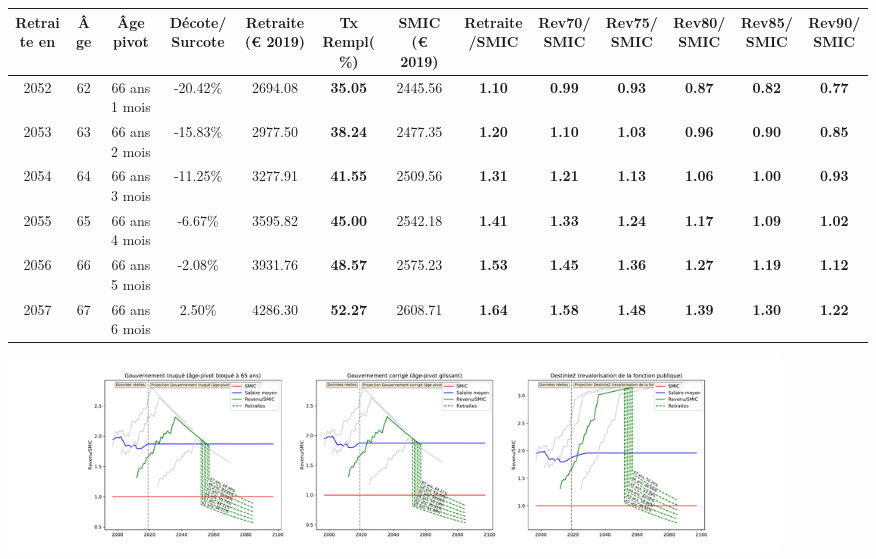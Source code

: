 { \scriptsize \begin{center} 
\begin{tabular}[htb]{|c|c||c|c||c|c||c||c|c|c|c|c|c|} 
\hline 
 Retraite en &  Âge &  Âge pivot &  Décote/Surcote &  Retraite (\euro{} 2019) &  Tx Rempl(\%) &  SMIC (\euro{} 2019) &  Retraite/SMIC &  Rev70/SMIC &  Rev75/SMIC &  Rev80/SMIC &  Rev85/SMIC &  Rev90/SMIC \\ 
\hline \hline 
 2052 &  62 &  66 ans 1 mois &  -20.42\% &  2694.08 &  {\bf 35.05} &  2445.56 &  {\bf 1.10} &  {\bf {\color{red} 0.99}} &  {\bf {\color{red} 0.93}} &  {\bf {\color{red} 0.87}} &  {\bf {\color{red} 0.82}} &  {\bf {\color{red} 0.77}} \\ 
\hline 
 2053 &  63 &  66 ans 2 mois &  -15.83\% &  2977.50 &  {\bf 38.24} &  2477.35 &  {\bf 1.20} &  {\bf 1.10} &  {\bf 1.03} &  {\bf {\color{red} 0.96}} &  {\bf {\color{red} 0.90}} &  {\bf {\color{red} 0.85}} \\ 
\hline 
 2054 &  64 &  66 ans 3 mois &  -11.25\% &  3277.91 &  {\bf 41.55} &  2509.56 &  {\bf 1.31} &  {\bf 1.21} &  {\bf 1.13} &  {\bf 1.06} &  {\bf {\color{red} 1.00}} &  {\bf {\color{red} 0.93}} \\ 
\hline 
 2055 &  65 &  66 ans 4 mois &  -6.67\% &  3595.82 &  {\bf 45.00} &  2542.18 &  {\bf 1.41} &  {\bf 1.33} &  {\bf 1.24} &  {\bf 1.17} &  {\bf 1.09} &  {\bf 1.02} \\ 
\hline 
 2056 &  66 &  66 ans 5 mois &  -2.08\% &  3931.76 &  {\bf 48.57} &  2575.23 &  {\bf 1.53} &  {\bf 1.45} &  {\bf 1.36} &  {\bf 1.27} &  {\bf 1.19} &  {\bf 1.12} \\ 
\hline 
 2057 &  67 &  66 ans 6 mois &  2.50\% &  4286.30 &  {\bf 52.27} &  2608.71 &  {\bf 1.64} &  {\bf 1.58} &  {\bf 1.48} &  {\bf 1.39} &  {\bf 1.30} &  {\bf 1.22} \\ 
\hline 
\hline 
\end{tabular} 
\end{center} } 

 \begin{center}\includegraphics[width=0.9\textwidth]{fig/ProfAgrege_1990_22_dest_retraite.pdf}\end{center} \label{fig/ProfAgrege_1990_22_dest_retraite.pdf} 

